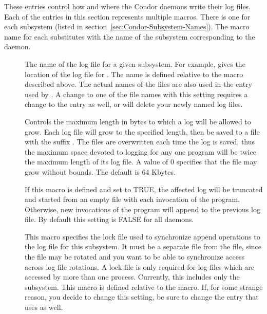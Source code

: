 These entries control how and where the Condor daemons write their log
files.  Each of the entries in this section represents multiple
macros. There is one for each subsystem (listed
in section~\ref{sec:Condor-Subsystem-Names}).
The macro name for each substitutes  with the name
of the subsystem corresponding to the daemon.
\begin{description}
 
\item[] \label{param:SubsysLog} The name of
  the log file for a given subsystem.  For example,
   gives the location of the log file for
  .  The name is defined relative to the
   macro described above.  The actual names of the files
  are also used in the  entry used by
  .  A change to one of the
  file names with this setting requires a change to the
   entry as well, or  will
  delete your newly named log files.

\item[] \label{param:MaxSubsysLog} Controls
  the maximum length in bytes to which a
  log will be allowed to grow.  Each log file will grow to the
  specified length, then be saved to a file with the suffix
  .  The 
  files are overwritten each time the log is saved, thus the maximum
  space devoted to logging for any one program will be twice the
  maximum length of its log file.  A value of 0 specifies that the
  file may grow without bounds.  The default is 64 Kbytes.

\item[]
  \label{param:TruncSubsysLogOnOpen}  If this macro is defined and set
  to TRUE, the affected log will be truncated and started from an
  empty file with each invocation of the program.  Otherwise, new
  invocations of the program will append to the previous log
  file.  By default this setting is FALSE for all daemons. 

\item[] \label{param:SubsysLock} This macro
  specifies the lock file used to synchronize append operations to the
  log file for this subsystem.  It must be a separate file from the
   file, since the  file may be
  rotated and you want to be able to synchronize access across log
  file rotations.  A lock file is only required for log files which
  are accessed by more than one process.  Currently, this includes
  only the  subsystem.  This macro is defined relative
  to the  macro.  If, for some strange
  reason, you decide to change this setting, be sure to change the
   entry that  uses as well.


\end{description}

